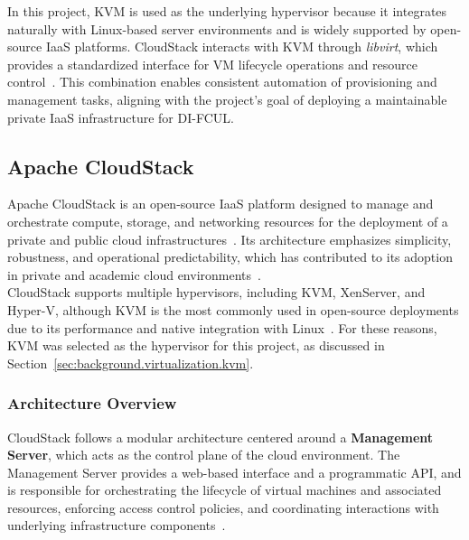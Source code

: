 \documentclass[sigplan]{acmart}
\begin{document}
            In this project, KVM is used as the underlying hypervisor because it integrates naturally with Linux-based server environments and is widely supported by open-source IaaS platforms. CloudStack interacts with KVM through \textit{libvirt}, which provides a standardized interface for VM lifecycle operations and resource control~\cite{vijayakumarPrivateCloudInfrastructure2025}. This combination enables consistent automation of provisioning and management tasks, aligning with the project's goal of deploying a maintainable private IaaS infrastructure for DI-FCUL.
    
    \subsection{Apache CloudStack} \label{sec:background.cloudstack}
    	Apache CloudStack is an open-source IaaS platform designed to manage and orchestrate compute, storage, and networking resources for the deployment of a private and public cloud infrastructures~\cite{IntroductionApacheCloudStack}. Its architecture emphasizes simplicity, robustness, and operational predictability, which has contributed to its adoption in private and academic cloud environments~\cite{lynnComparativeStudyCurrent2015}.\\
    
    	CloudStack supports multiple hypervisors, including KVM, XenServer, and Hyper-V\cite{IntroductionApacheCloudStack}, although KVM is the most commonly used in open-source deployments due to its performance and native integration with Linux~\cite{IntroductionApacheCloudStack, algarniPerformanceEvaluationXen2018, vijayakumarPrivateCloudInfrastructure2025}. For these reasons, KVM was selected as the hypervisor for this project, as discussed in Section~\ref{sec:background.virtualization.kvm}.
    
    	\subsubsection{Architecture Overview}
    		CloudStack follows a modular architecture centered around a \textbf{Management Server}, which acts as the control plane of the cloud environment. The Management Server provides a web-based interface and a programmatic API, and is responsible for orchestrating the lifecycle of virtual machines and associated resources, enforcing access control policies, and coordinating interactions with underlying infrastructure components~\cite{IntroductionApacheCloudStack}.\\
    
\end{document}
